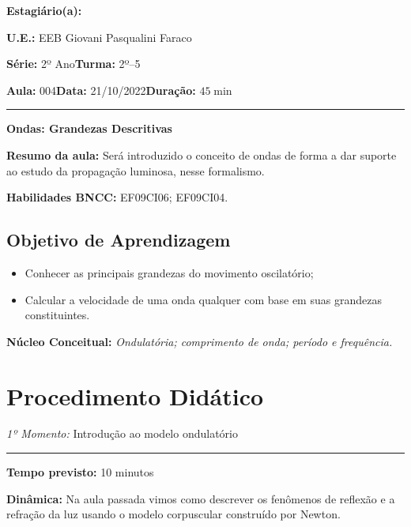     \noindent \textbf{Estagiário(a): }\imprimirautor 
    
    \noindent \textbf{U.E.:} EEB Giovani Pasqualini Faraco
    
    \noindent \textbf{Série:} 2º Ano\hfill{}\textbf{Turma:} 2º--5
    
    \noindent \textbf{Aula:} 004\hfill{}\textbf{Data:} 21/10/2022\hfill{}\textbf{Duração:} $45\min$
    \rule{\textwidth}{.5pt}
    \bigskip{}  
    

    \noindent
    \begin{center}
      \textbf{Ondas: Grandezas Descritivas}
    \par\end{center}
    \vspace{20pt}
    \par\noindent\textbf{Resumo da aula:} Será introduzido o conceito de ondas de forma a dar suporte ao estudo da propagação luminosa, nesse formalismo.
    \vspace{20pt}
    \par\noindent \textbf{Habilidades BNCC:} EF09CI06; EF09CI04.    
    \vfill     
    \subsection*{Objetivo de Aprendizagem}
    \begin{itemize}
        \item Conhecer as principais grandezas do movimento oscilatório;
        \item Calcular a velocidade de uma onda qualquer com base em suas grandezas constituintes.
    \end{itemize}
    \medskip{}
    \vfill  
    \noindent \textbf{Núcleo Conceitual:} \emph{Ondulatória; comprimento de onda; período e frequência.}

    \newpage
    \section*{Procedimento Didático} 
    \noindent \emph{1º Momento:} Introdução ao modelo ondulatório
    \par\noindent\rule{.3\textwidth}{.5pt}  
    \par\noindent \textbf{Tempo previsto:} 10 minutos

    \noindent \textbf{Dinâmica:} Na aula passada vimos como descrever os fenômenos de reflexão e a refração da luz usando o modelo corpuscular construído por Newton.

